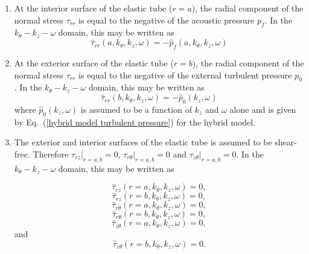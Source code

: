 \documentclass[twocolumn,10pt]{asme2ej}
\begin{document}
\begin{enumerate}
    \item At the interior surface of the elastic  tube ($r=a$), the radial component of the normal stress $\tau_{rr}$ is equal to the negative of the acoustic pressure $p_f$. In the $k_\theta-k_z-\omega$ domain, this may be written as
    \begin{equation}\label{BC1 3d}
       \hat{\tau}_{rr}(a,k_\theta,k_{z},\omega) = -\hat{p}_{f}(a,k_\theta,k_{z},\omega) 
    \end{equation}

    \item At the exterior surface of the elastic  tube ($r=b$), the radial component of the normal stress $\tau_{rr}$ is equal to the negative of the external turbulent pressure $p_0$. In the $k_\theta-k_z-\omega$ domain, this may be written as
    \begin{equation}\label{BC2 3d}
        \hat{\tau}_{rr}(b,k_\theta,k_{z},\omega)= -\hat{p}_{0}(k_{z},\omega)
    \end{equation}
     where $\hat{p}_{0}(k_z,\omega)$ is assumed to be a function of $k_z$ and $\omega$ alone and is given by Eq.~(\ref{hybrid model turbulent pressure}) for the hybrid model.

     \item The exterior and interior surfaces of the elastic tube is assumed to be shear-free. Therefore $\tau_{rz}|_{r=a,b} = 0$, $\tau_{r\theta}|_{r=a,b} = 0$ and $\tau_{z\theta}|_{r=a,b} = 0$. In the $k_\theta-k_z-\omega$ domain, this may be written as
     
     \begin{equation}\label{BC3 3d}
         \hat{\tau}_{rz}(r=a,k_\theta,k_z,\omega) = 0,
     \end{equation}
     \begin{equation}\label{BC4 3d}
         \hat{\tau}_{rz}(r=b,k_\theta,k_z,\omega) = 0,
     \end{equation}
     \begin{equation}\label{BC5 3d}
         \hat{\tau}_{r\theta}(r=a,k_\theta,k_z,\omega) = 0,
     \end{equation}
     \begin{equation}\label{BC6 3d}
         \hat{\tau}_{r\theta}(r=b,k_\theta,k_z,\omega) = 0,
     \end{equation}
     \begin{equation}\label{BC7 3d}
         \hat{\tau}_{z\theta}(r=a,k_\theta,k_z,\omega) = 0,
     \end{equation}
     and
     \begin{equation}\label{BC8 3d}
         \hat{\tau}_{z\theta}(r=b,k_\theta,k_z,\omega) = 0.
     \end{equation}


\end{enumerate}
\end{document}
